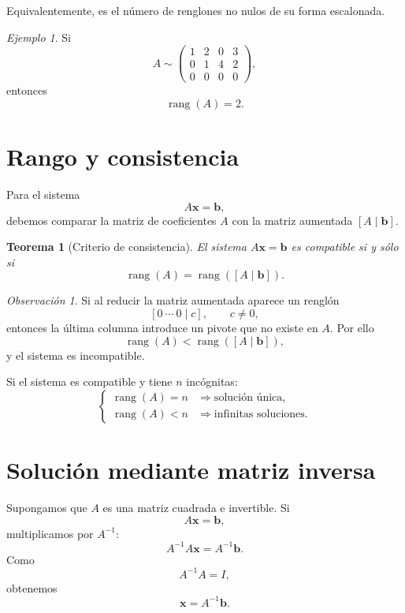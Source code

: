 \documentclass[12pt]{article}
\newtheorem{teorema}[definicion]{Teorema}
\theoremstyle{remark}
\newtheorem{observacion}[definicion]{Observación}
\newtheorem{ejemplo}[definicion]{Ejemplo}
\newcommand{\rank}{\operatorname{rang}}
\begin{document}
Equivalentemente, es el número de renglones no nulos de su forma escalonada.

\begin{ejemplo}
Si
\[
A\sim
\begin{pmatrix}
1&2&0&3\\
0&1&4&2\\
0&0&0&0
\end{pmatrix},
\]
entonces
\[
\rank(A)=2.
\]
\end{ejemplo}

\section{Rango y consistencia}

Para el sistema
\[
A\mathbf{x}=\mathbf b,
\]
debemos comparar la matriz de coeficientes $A$ con la matriz aumentada $[A\mid\mathbf b]$.

\begin{teorema}[Criterio de consistencia]
El sistema $A\mathbf{x}=\mathbf b$ es compatible si y sólo si
\[
\rank(A)=\rank([A\mid\mathbf b]).
\]
\end{teorema}

\begin{observacion}
Si al reducir la matriz aumentada aparece un renglón
\[
[0\ \cdots\ 0\mid c],\qquad c\neq0,
\]
entonces la última columna introduce un pivote que no existe en $A$. Por ello
\[
\rank(A)<\rank([A\mid\mathbf b]),
\]
y el sistema es incompatible.
\end{observacion}

Si el sistema es compatible y tiene $n$ incógnitas:
\[
\begin{cases}
\rank(A)=n &\Longrightarrow \text{solución única},\\
\rank(A)<n &\Longrightarrow \text{infinitas soluciones}.
\end{cases}
\]

\section{Solución mediante matriz inversa}

Supongamos que $A$ es una matriz cuadrada e invertible. Si
\[
A\mathbf{x}=\mathbf b,
\]
multiplicamos por $A^{-1}$:
\[
A^{-1}A\mathbf{x}=A^{-1}\mathbf b.
\]
Como
\[
A^{-1}A=I,
\]
obtenemos
\[
\boxed{\mathbf{x}=A^{-1}\mathbf b.}
\]
\end{document}
